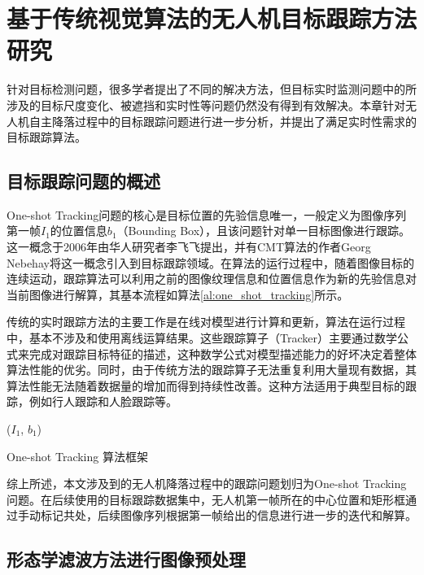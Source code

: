 \chapter{基于传统视觉算法的无人机目标跟踪方法研究}

针对目标检测问题，很多学者提出了不同的解决方法，但目标实时监测问题中的所涉及的目标尺度变化、被遮挡和实时性等问题仍然没有得到有效解决。本章针对无人机自主降落过程中的目标跟踪问题进行进一步分析，并提出了满足实时性需求的目标跟踪算法。

\section{目标跟踪问题的概述}
One-shot Tracking问题的核心是目标位置的先验信息唯一，一般定义为图像序列第一帧$I_1$的位置信息$b_1$（Bounding Box），且该问题针对单一目标图像进行跟踪。这一概念于2006年由华人研究者李飞飞提出\cite{fei2006one}，并有CMT算法\cite{Nebehay2016}的作者Georg Nebehay将这一概念引入到目标跟踪领域。在算法的运行过程中，随着图像目标的连续运动，跟踪算法可以利用之前的图像纹理信息和位置信息作为新的先验信息对当前图像进行解算，其基本流程如算法\ref{al:one_shot_tracking}所示。

传统的实时跟踪方法的主要工作是在线对模型进行计算和更新，算法在运行过程中，基本不涉及和使用离线运算结果。这些跟踪算子（Tracker）主要通过数学公式来完成对跟踪目标特征的描述，这种数学公式对模型描述能力的好坏决定着整体算法性能的优劣。同时，由于传统方法的跟踪算子无法重复利用大量现有数据，其算法性能无法随着数据量的增加而得到持续性改善。这种方法适用于典型目标的跟踪，例如行人跟踪和人脸跟踪等。

\begin{algorithm2e}[H]
	\SetAlgoLined
	\BlankLine
	\Initialization($I_1$, $b_1$)\;
	\caption{One-shot Tracking 算法框架}
	\label{al:one_shot_tracking}
\end{algorithm2e}
综上所述，本文涉及到的无人机降落过程中的跟踪问题划归为One-shot Tracking问题。在后续使用的目标跟踪数据集中，无人机第一帧所在的中心位置和矩形框通过手动标记共处，后续图像序列根据第一帧给出的信息进行进一步的迭代和解算。

\section{形态学滤波方法进行图像预处理}

